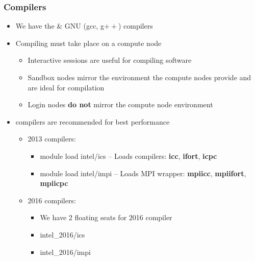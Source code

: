 \begin{frame}
\frametitle{Compilers}
	\begin{itemize}
		\item We have the {\intel} \& GNU (gcc, g$++$) compilers
		\item Compiling must take place on a compute node
		\begin{itemize}
			\item Interactive sessions are useful for compiling software
			\item Sandbox nodes mirror the environment the compute nodes provide and are ideal for compilation
			\item Login nodes \textbf{do not} mirror the compute node environment
		\end{itemize}
		\item {\intel} compilers are recommended for best performance
		\begin{itemize}
			\item {\intel} 2013 compilers:
			\begin{itemize}
				\item module load intel/ics -- Loads {\intel} compilers: {\tiny \textbf{icc}, \textbf{ifort}, \textbf{icpc}}
				\item module load intel/impi -- Loads {\intel} MPI wrapper: {\tiny\textbf{mpiicc}, \textbf{mpiifort}, \textbf{mpiicpc}}
			\end{itemize}
			\item {\intel} 2016 compilers:
			\begin{itemize}
				\item We have 2 floating seats for {\intel} 2016 compiler
				\item intel\_2016/ics 
				\item intel\_2016/impi 
			\end{itemize}
		\end{itemize}			
	\end{itemize}
\end{frame}


